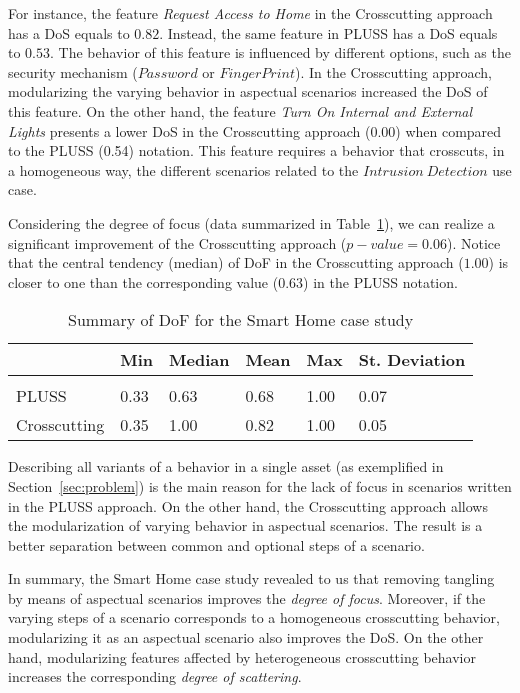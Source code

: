 For instance, the feature \emph{Request Access to Home} in the Crosscutting
approach has a DoS equals to $0.82$. Instead, the same feature in PLUSS has a
DoS equals to $0.53$. The behavior of this feature is influenced by different
options, such as the security mechanism ($Password$ or $Finger Print$).
In the Crosscutting approach, modularizing the varying behavior in
aspectual scenarios increased the DoS of this feature.
On the other hand, the feature \emph{Turn On Internal and External Lights}
presents a lower DoS in the Crosscutting approach (0.00) when compared to the
PLUSS (0.54) notation. This feature requires a behavior that crosscuts, in a
homogeneous way, the different scenarios related to the $Intrusion\ Detection$
use case.

Considering the degree of focus (data summarized in Table~\ref{tab:sh-dof}), we
can realize a significant improvement of the Crosscutting approach
($p-value=0.06$). Notice that the central tendency (median) of DoF in the
Crosscutting approach ($1.00$) is closer to one than the corresponding value
($0.63$) in the PLUSS notation.

\begin{table}[htb] \centering
\caption{Summary of DoF for the Smart Home case study}
\label{tab:sh-dof}
\begin{small}
\begin{tabular}{llllll} \hline
					& Min 	& Median 	& Mean 	& Max 	& St. Deviation \\ \hline \\
	PLUSS			& 0.33  & 0.63   	& 0.68  & 1.00 	& 0.07 			\\
	Crosscutting	& 0.35  & 1.00   	& 0.82 	& 1.00 	& 0.05			\\ \hline	
\end{tabular}
\end{small}
\end{table}

Describing all variants of a behavior in a single asset
(as exemplified in Section~\ref{sec:problem}) is the main reason for the lack of
focus in scenarios written in the PLUSS approach. On the other hand, the Crosscutting approach
allows the modularization of varying behavior in aspectual scenarios. The result
is a better separation between common and optional steps of a scenario.

In summary, the Smart Home case study revealed to us that removing tangling by
means of aspectual scenarios improves the \emph{degree of focus}. Moreover, if
the varying steps of a scenario corresponds to a homogeneous crosscutting
behavior, modularizing it as an aspectual scenario also improves the DoS. On the
other hand, modularizing features affected by heterogeneous crosscutting
behavior increases the corresponding \emph{degree of scattering}.

